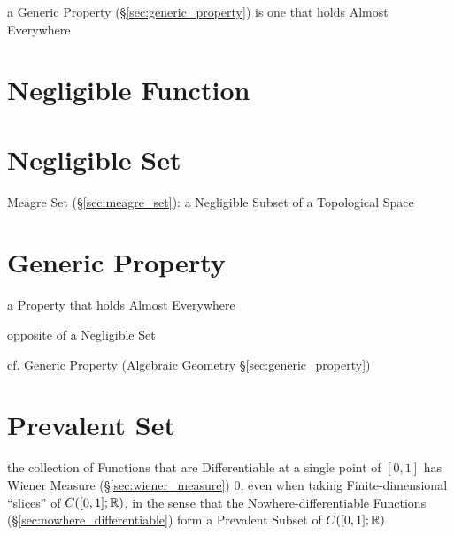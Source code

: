 a Generic Property (\S\ref{sec:generic_property}) is one that holds Almost
Everywhere



\section{Negligible Function}\label{sec:negligible_function}

\section{Negligible Set}\label{sec:negligible_set}

Meagre Set (\S\ref{sec:meagre_set}): a Negligible Subset of a Topological Space



\section{Generic Property}\label{sec:generic_measure_property}

a Property that holds Almost Everywhere

opposite of a Negligible Set

cf. Generic Property (Algebraic Geometry \S\ref{sec:generic_property})



\section{Prevalent Set}\label{sec:prevalent_set}

the collection of Functions that are Differentiable at a single point of
$[0,1]$ has Wiener Measure (\S\ref{sec:wiener_measure}) $0$, even when taking
Finite-dimensional ``slices'' of $C([0,1];\mathbb{R})$, in the sense that the
Nowhere-differentiable Functions (\S\ref{sec:nowhere_differentiable}) form a
Prevalent Subset of $C([0,1]; \mathbb{R})$



